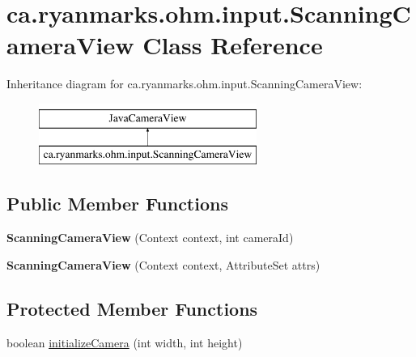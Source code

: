 \hypertarget{classca_1_1ryanmarks_1_1ohm_1_1input_1_1_scanning_camera_view}{}\section{ca.\+ryanmarks.\+ohm.\+input.\+Scanning\+Camera\+View Class Reference}
\label{classca_1_1ryanmarks_1_1ohm_1_1input_1_1_scanning_camera_view}
Inheritance diagram for ca.\+ryanmarks.\+ohm.\+input.\+Scanning\+Camera\+View\+:\begin{figure}[H]
\begin{center}
\leavevmode
\includegraphics[height=2.000000cm]{classca_1_1ryanmarks_1_1ohm_1_1input_1_1_scanning_camera_view}
\end{center}
\end{figure}
\subsection*{Public Member Functions}
\begin{DoxyCompactItemize}
\item 
\hypertarget{classca_1_1ryanmarks_1_1ohm_1_1input_1_1_scanning_camera_view_ac0f86fb041db0384361798ae08a78853}{}\label{classca_1_1ryanmarks_1_1ohm_1_1input_1_1_scanning_camera_view_ac0f86fb041db0384361798ae08a78853} 
{\bfseries Scanning\+Camera\+View} (Context context, int camera\+Id)
\item 
\hypertarget{classca_1_1ryanmarks_1_1ohm_1_1input_1_1_scanning_camera_view_a723d3439c32c6060135610e6c744cb38}{}\label{classca_1_1ryanmarks_1_1ohm_1_1input_1_1_scanning_camera_view_a723d3439c32c6060135610e6c744cb38} 
{\bfseries Scanning\+Camera\+View} (Context context, Attribute\+Set attrs)
\end{DoxyCompactItemize}
\subsection*{Protected Member Functions}
\begin{DoxyCompactItemize}
\item 
boolean \hyperlink{classca_1_1ryanmarks_1_1ohm_1_1input_1_1_scanning_camera_view_a6a040425f2dd892fd5b81767203b405c}{initialize\+Camera} (int width, int height)
\end{DoxyCompactItemize}


